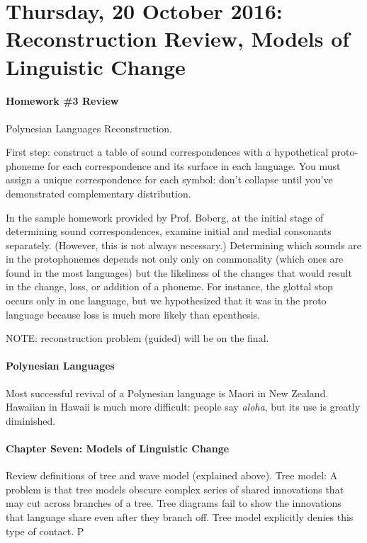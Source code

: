 \documentclass{exam}
\begin{document}
\section*{Thursday, 20 October 2016: Reconstruction Review, Models of Linguistic Change}

\paragraph{Homework \#3 Review} Polynesian Languages Reconstruction. 

First step: construct a table of sound correspondences with a hypothetical proto-phoneme for each correspondence and its surface in each language. You must assign a unique correspondence for each symbol: don't collapse until you've demonstrated complementary distribution. 

In the sample homework provided by Prof. Boberg, at the initial stage of determining sound correspondences, examine initial and medial consonants separately. (However, this is not always necessary.) Determining which sounds are in the protophonemes depends not only only on commonality (which ones are found in the most languages) but the likeliness of the changes that would result in the change, loss, or addition of a phoneme. For instance, the glottal stop occurs only in one language, but we hypothesized that it was in the proto language because loss is much more likely than epenthesis. 

NOTE: reconstruction problem (guided) will be on the final.


\paragraph{Polynesian Languages} Most successful revival of a Polynesian language is Maori in New Zealand. Hawaiian in Hawaii is much more difficult: people say \textit{aloha}, but its use is greatly diminished. 


\paragraph{Chapter Seven: Models of Linguistic Change} Review definitions of tree and wave model (explained above). Tree model: A problem is that tree models obscure complex series of shared innovations that may cut across branches of a tree. Tree diagrams fail to show the innovations that language share even after they branch off. Tree model explicitly denies this type of contact. P
\end{document}
